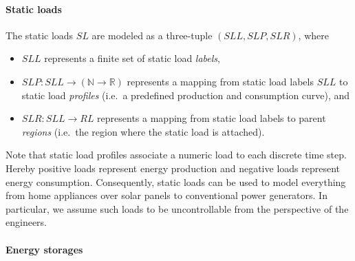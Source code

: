 \paragraph{Static loads}
\label{static_loads}

The static loads $SL$ are modeled as a three-tuple $(SLL, SLP, SLR)$, where
\begin{itemize}
	\item $SLL$ represents a finite set of static load \textit{labels},
	\item $SLP: SLL \rightarrow (\mathbb{N} \rightarrow \mathbb{R})$ represents a mapping from static load labels $SLL$ to static load \textit{profiles} (i.e.\ a predefined production and consumption curve), and
	\item $SLR: SLL \rightarrow RL$ represents a mapping from static load labels to parent \textit{regions} (i.e.\ the region where the static load is attached).
\end{itemize}
Note that static load profiles associate a numeric load to each discrete time step. Hereby positive loads represent energy production and negative loads represent energy consumption. Consequently, static loads can be used to model everything from home appliances over solar panels to conventional power generators. In particular, we assume such loads to be uncontrollable from the perspective of the engineers.

\paragraph{Energy storages}
\label{energy_storages}

